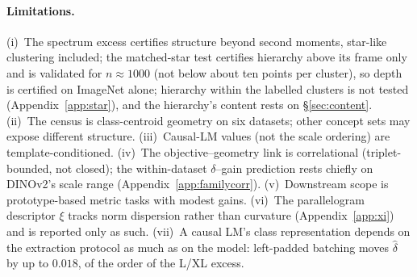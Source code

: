 \paragraph{Limitations.} (i)~The spectrum excess certifies structure beyond second moments, star-like clustering included; the matched-star test certifies hierarchy above its frame only and is validated for $n\approx1000$ (not below about ten points per cluster), so depth is certified on ImageNet alone; hierarchy within the labelled clusters is not tested (Appendix~\ref{app:star}), and the hierarchy's content rests on \S\ref{sec:content}. (ii)~The census is class-centroid geometry on six datasets; other concept sets may expose different structure. (iii)~Causal-LM values (not the scale ordering) are template-conditioned. (iv)~The objective--geometry link is correlational (triplet-bounded, not closed); the within-dataset $\delta$--gain prediction rests chiefly on DINOv2's scale range (Appendix~\ref{app:familycorr}). (v)~Downstream scope is prototype-based metric tasks with modest gains. (vi)~The parallelogram descriptor $\xi$ tracks norm dispersion rather than curvature (Appendix~\ref{app:xi}) and is reported only as such. (vii)~A causal LM's class representation depends on the extraction protocol as much as on the model: left-padded batching moves $\hat\delta$ by up to $0.018$, of the order of the L/XL excess.

